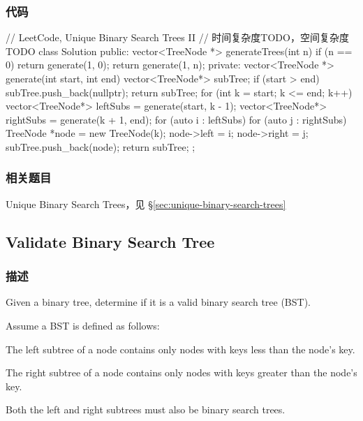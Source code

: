 \subsubsection{代码}

\begin{Code}
// LeetCode, Unique Binary Search Trees II
// 时间复杂度TODO，空间复杂度TODO
class Solution {
public:
    vector<TreeNode *> generateTrees(int n) {
        if (n == 0) return generate(1, 0);
        return generate(1, n);
    }
private:
    vector<TreeNode *> generate(int start, int end) {
        vector<TreeNode*> subTree;
        if (start > end) {
            subTree.push_back(nullptr);
            return subTree;
        }
        for (int k = start; k <= end; k++) {
            vector<TreeNode*> leftSubs = generate(start, k - 1);
            vector<TreeNode*> rightSubs = generate(k + 1, end);
            for (auto i : leftSubs) {
                for (auto j : rightSubs) {
                    TreeNode *node = new TreeNode(k);
                    node->left = i;
                    node->right = j;
                    subTree.push_back(node);
                }
            }
        }
        return subTree;
    }
};
\end{Code}


\subsubsection{相关题目}
\begindot
\item Unique Binary Search Trees，见 \S \ref{sec:unique-binary-search-trees}
\myenddot


\subsection{Validate Binary Search Tree}
\label{sec:validate-binary-search-tree}


\subsubsection{描述}
Given a binary tree, determine if it is a valid binary search tree (BST).

Assume a BST is defined as follows:
\begindot
\item The left subtree of a node contains only nodes with keys less than the node's key.
\item The right subtree of a node contains only nodes with keys greater than the node's key.
\item Both the left and right subtrees must also be binary search trees.
\myenddot



